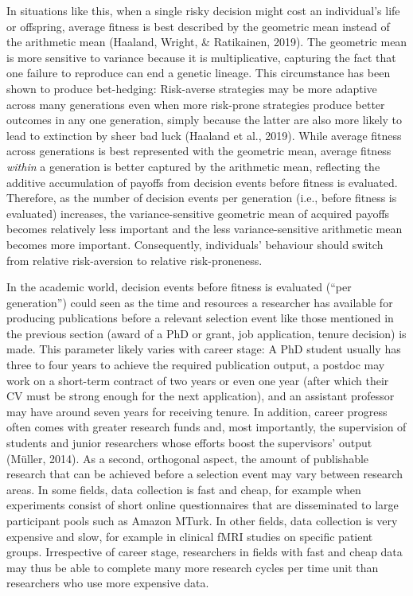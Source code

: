 \documentclass[british,,doc,mask,floatsintext]{apa6}
\begin{document}
In situations like this, when a single risky decision might cost an individual's life or offspring, average fitness is best described by the geometric mean instead of the arithmetic mean (Haaland, Wright, \& Ratikainen, 2019).
The geometric mean is more sensitive to variance because it is multiplicative, capturing the fact that one failure to reproduce can end a genetic lineage.
This circumstance has been shown to produce bet-hedging:
Risk-averse strategies may be more adaptive across many generations even when more risk-prone strategies produce better outcomes in any one generation, simply because the latter are also more likely to lead to extinction by sheer bad luck (Haaland et al., 2019).
While average fitness across generations is best represented with the geometric mean, average fitness \emph{within} a generation is better captured by the arithmetic mean, reflecting the additive accumulation of payoffs from decision events before fitness is evaluated.
Therefore, as the number of decision events per generation (i.e., before fitness is evaluated) increases, the variance-sensitive geometric mean of acquired payoffs becomes relatively less important and the less variance-sensitive arithmetic mean becomes more important.
Consequently, individuals' behaviour should switch from relative risk-aversion to relative risk-proneness.

In the academic world, decision events before fitness is evaluated (\enquote{per generation}) could seen as the time and resources a researcher has available for producing publications before a relevant selection event like those mentioned in the previous section (award of a PhD or grant, job application, tenure decision) is made.
This parameter likely varies with career stage:
A PhD student usually has three to four years to achieve the required publication output, a postdoc may work on a short-term contract of two years or even one year (after which their CV must be strong enough for the next application), and an assistant professor may have around seven years for receiving tenure.
In addition, career progress often comes with greater research funds and, most importantly, the supervision of students and junior researchers whose efforts boost the supervisors' output (Müller, 2014).
As a second, orthogonal aspect, the amount of publishable research that can be achieved before a selection event may vary between research areas.
In some fields, data collection is fast and cheap, for example when experiments consist of short online questionnaires that are disseminated to large participant pools such as Amazon MTurk.
In other fields, data collection is very expensive and slow, for example in clinical fMRI studies on specific patient groups.
Irrespective of career stage, researchers in fields with fast and cheap data may thus be able to complete many more research cycles per time unit than researchers who use more expensive data.
\end{document}
